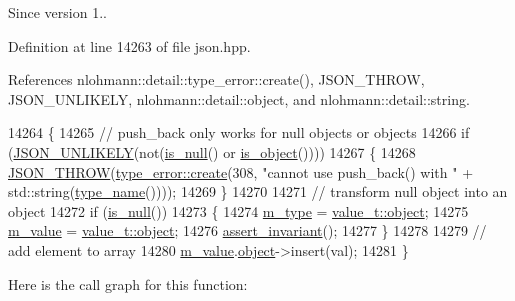 \begin{DoxySince}{Since}
version 1.. 
\end{DoxySince}


Definition at line 14263 of file json.\+hpp.



References nlohmann\+::detail\+::type\+\_\+error\+::create(), J\+S\+O\+N\+\_\+\+T\+H\+R\+OW, J\+S\+O\+N\+\_\+\+U\+N\+L\+I\+K\+E\+LY, nlohmann\+::detail\+::object, and nlohmann\+::detail\+::string.


\begin{DoxyCode}
14264     \{
14265         \textcolor{comment}{// push\_back only works for null objects or objects}
14266         \textcolor{keywordflow}{if} (\hyperlink{json_8hpp_ab77582407c64944e7db1ea95ab520253}{JSON\_UNLIKELY}(not(\hyperlink{classnlohmann_1_1basic__json_a8faa039ca82427ed29c486ffd00600c3}{is\_null}() or \hyperlink{classnlohmann_1_1basic__json_af8f511af124e82e4579f444b4175787c}{is\_object}())))
14267         \{
14268             \hyperlink{json_8hpp_a6c274f6db2e65c1b66c7d41b06ad690f}{JSON\_THROW}(\hyperlink{classnlohmann_1_1detail_1_1type__error_aecc083aea4b698c33d042670ba50c10f}{type\_error::create}(308, \textcolor{stringliteral}{"cannot use push\_back() with "} +
       std::string(\hyperlink{classnlohmann_1_1basic__json_a9d0a478571f82f0163b96b2424cd998f}{type\_name}())));
14269         \}
14270 
14271         \textcolor{comment}{// transform null object into an object}
14272         \textcolor{keywordflow}{if} (\hyperlink{classnlohmann_1_1basic__json_a8faa039ca82427ed29c486ffd00600c3}{is\_null}())
14273         \{
14274             \hyperlink{classnlohmann_1_1basic__json_a91990b60d7d4d67968a2c1db677536e7}{m\_type} = \hyperlink{namespacenlohmann_1_1detail_a1ed8fc6239da25abcaf681d30ace4985aa8cfde6331bd59eb2ac96f8911c4b666}{value\_t::object};
14275             \hyperlink{classnlohmann_1_1basic__json_aeb0814f76966f99290cb29e127c90a77}{m\_value} = \hyperlink{namespacenlohmann_1_1detail_a1ed8fc6239da25abcaf681d30ace4985aa8cfde6331bd59eb2ac96f8911c4b666}{value\_t::object};
14276             \hyperlink{classnlohmann_1_1basic__json_a4a82d3fb7a111641decf35c2fb707c7f}{assert\_invariant}();
14277         \}
14278 
14279         \textcolor{comment}{// add element to array}
14280         \hyperlink{classnlohmann_1_1basic__json_aeb0814f76966f99290cb29e127c90a77}{m\_value}.\hyperlink{unionnlohmann_1_1basic__json_1_1json__value_a4a2209bb26e7088cd36bf24824ab5521}{object}->insert(val);
14281     \}
\end{DoxyCode}
Here is the call graph for this function\+:
\mbox{\label{classnlohmann_1_1basic__json_a1be31ef2d2934d37a818083a4af44f99}} 
